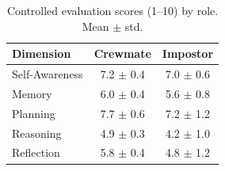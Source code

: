\begin{table}[h]
\centering
\caption{Controlled evaluation scores (1--10) by role. Mean $\pm$ std.}
\label{tab:controlled_eval}
\begin{tabular}{lcc}
\toprule
Dimension & Crewmate & Impostor \\
\midrule
Self-Awareness & 7.2 $\pm$ 0.4 & 7.0 $\pm$ 0.6 \\
Memory & 6.0 $\pm$ 0.4 & 5.6 $\pm$ 0.8 \\
Planning & 7.7 $\pm$ 0.6 & 7.2 $\pm$ 1.2 \\
Reasoning & 4.9 $\pm$ 0.3 & 4.2 $\pm$ 1.0 \\
Reflection & 5.8 $\pm$ 0.4 & 4.8 $\pm$ 1.2 \\
\bottomrule
\end{tabular}
\end{table}